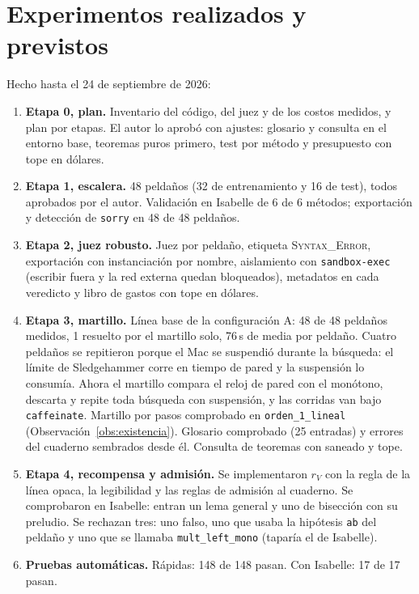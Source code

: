 \documentclass[11pt,a4paper]{article}
\begin{document}
\section{Experimentos realizados y previstos}

Hecho hasta el 24 de septiembre de 2026:
\begin{enumerate}
  \item \textbf{Etapa 0, plan.} Inventario del código, del juez y de los costos medidos, y plan por etapas. El autor lo aprobó con ajustes: glosario y consulta en el entorno base, teoremas puros primero, test por método y presupuesto con tope en dólares.
  \item \textbf{Etapa 1, escalera.} 48 peldaños (32 de entrenamiento y 16 de test), todos aprobados por el autor. Validación en Isabelle de 6 de 6 métodos; exportación y detección de \texttt{sorry} en 48 de 48 peldaños.
  \item \textbf{Etapa 2, juez robusto.} Juez por peldaño, etiqueta \textsc{Syntax\_Error}, exportación con instanciación por nombre, aislamiento con \texttt{sandbox-exec} (escribir fuera y la red externa quedan bloqueados), metadatos en cada veredicto y libro de gastos con tope en dólares.
  \item \textbf{Etapa 3, martillo.} Línea base de la configuración A: 48 de 48 peldaños medidos, 1 resuelto por el martillo solo, 76\,s de media por peldaño. Cuatro peldaños se repitieron porque el Mac se suspendió durante la búsqueda: el límite de Sledgehammer corre en tiempo de pared y la suspensión lo consumía. Ahora el martillo compara el reloj de pared con el monótono, descarta y repite toda búsqueda con suspensión, y las corridas van bajo \texttt{caffeinate}. Martillo por pasos comprobado en \texttt{orden\_\allowbreak{}1\_\allowbreak{}lineal} (Observación~\ref{obs:existencia}). Glosario comprobado (25 entradas) y errores del cuaderno sembrados desde él. Consulta de teoremas con saneado y tope.
  \item \textbf{Etapa 4, recompensa y admisión.} Se implementaron $r_V$ con la regla de la línea opaca, la legibilidad y las reglas de admisión al cuaderno. Se comprobaron en Isabelle: entran un lema general y uno de bisección con su preludio. Se rechazan tres: uno falso, uno que usaba la hipótesis \texttt{ab} del peldaño y uno que se llamaba \texttt{mult\_left\_mono} (taparía el de Isabelle).
  \item \textbf{Pruebas automáticas.} Rápidas: 148 de 148 pasan. Con Isabelle: 17 de 17 pasan.
\end{enumerate}
\end{document}
